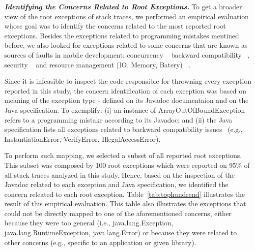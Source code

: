 \documentclass[conference]{IEEEtran}
\begin{document}

\emph{\textbf{Identifying the Concerns Related to Root Exceptions.}} To get a broader view of the root exceptions of stack traces,
we performed an empirical evaluation whose goal was to identify the concerns related to the most reported root exceptions.
Besides the exceptions related to programming mistakes mentined before, we also looked for exceptions related to some concerns that are known as sources of faults in mobile development: concurrency ~\cite{ama2012} backward compatibility ~\cite{McDon13}, security ~\cite{enck2011study,was2010} and resource management (IO, Memory, Batery) ~\cite{Zhang12}.

Since it is infeasible to inspect the code responsible for throwning every exception reported in this study,
the concern identification of each exception was based on meaning of the exception type - defined on 
its Javadoc documentaion and on the Java specification. To exemplify: (i) an instance of ArrayOutOfBoundException  
refers to a programming mistake according to its Javadoc; and (ii) the Java specification lists all 
exceptions related to backward compatibility issues~\cite{javaback} (e.g., InstantiationError, VerifyError, IllegalAccessError).

To perform such mapping, we selected a subset of all reported root exceptions. This subset was composed by 100 root exceptions
which were reported on 95\% of all stack traces analyzed in this study. Hence, based on the inspection of the 
Javadoc related to each exception and Java specification, we identified the concern releated to each root exception. 
Table~\ref{tab:tophundrend} illustrates the result of this empirical evaluation. This table also illustrates the exceptions 
that could not be directly mapped to one of the aforementioned concerns, either because they were too general (i.e., java.lang.Exception,
java.lang.RuntimeException, java.lang.Error) or because they were related to other concerns (e.g., specific to an application or given library).
\end{document}
